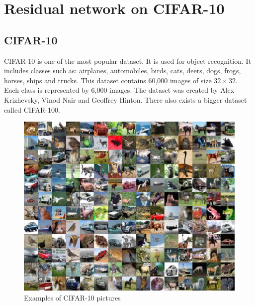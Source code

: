 \documentclass[licencjacka]{pracamgr}
\begin{document}
  	\section{Residual network on CIFAR-10}
		\subsection{CIFAR-10}
		CIFAR-10 is one of the most popular dataset. It is used for object recognition. It includes classes such as: airplanes, automobiles, birds, cats, deers, dogs, frogs, horses, ships and trucks. This dataset contains 60,000 images of size $32\times32$. Each class is represented by 6,000 images. The dataset was created by Alex Krizhevsky, Vinod Nair and Geoffrey Hinton. There also exists a bigger dataset called CIFAR-100.
		\begin{figure}[h]
				\caption{Examples of CIFAR-10 pictures}
				\centering
				\includegraphics[width=\textwidth]{images/cifar-10}
			\end{figure}
\end{document}
